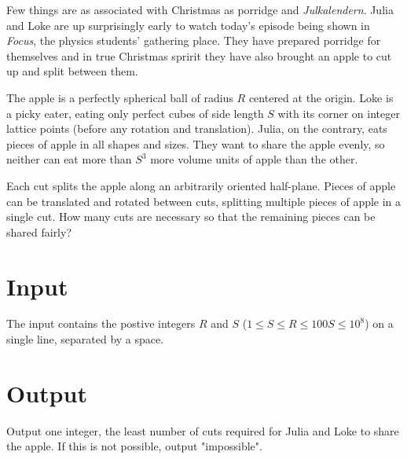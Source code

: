 
\noindent Few things are as associated with Christmas as porridge and
\textit{Julkalendern}. Julia and Loke are up surprisingly early to watch today's
episode being shown in \textit{Focus}, the physics students' gathering place.
They have prepared porridge for themselves and in true Christmas spririt they
have also brought an apple to cut up and split between them.

\noindent The apple is a perfectly spherical ball of radius $R$ centered at the
origin. Loke is a picky eater, eating only perfect cubes of side length $S$ with
its corner on integer lattice points (before any rotation and translation).
Julia, on the contrary, eats pieces of apple in all shapes and sizes.  They want
to share the apple evenly, so neither can eat more than $S^3$ more volume units
of apple than the other.

\noindent Each cut splits the apple along an arbitrarily oriented half-plane.
Pieces of apple can be translated and rotated between cuts, splitting multiple
pieces of apple in a single cut. How many cuts are necessary so that the
remaining pieces can be shared fairly?

\section*{Input}

The input contains the postive integers $R$ and $S$ ($1 \le S \le R \le 100 S
\le 10^8$) on a single line, separated by a space.

\section*{Output}

Output one integer, the least number of cuts required for Julia and Loke to
share the apple. If this is not possible, output "impossible".
